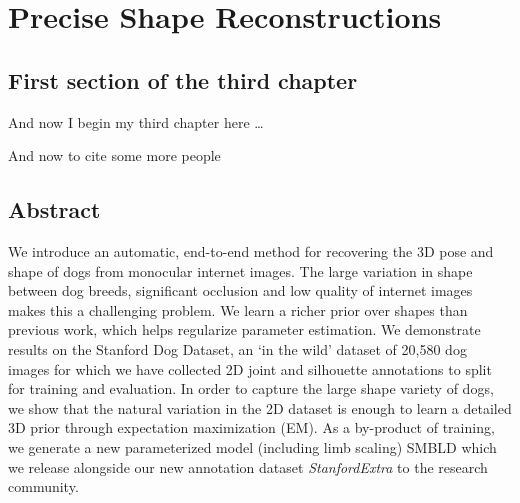 \chapter{Precise Shape Reconstructions}

\ifpdf
    \graphicspath{{Chapter4/Figs/Raster/}{Chapter4/Figs/PDF/}{Chapter4/Figs/}}
\else
    \graphicspath{{Chapter4/Figs/Vector/}{Chapter4/Figs/}}
\fi

\section{First section of the third chapter}
And now I begin my third chapter here \dots

And now to cite some more people~\citet{Rea85,Ancey1996}


\section{Abstract}
  We introduce an automatic, end-to-end method for recovering the 3D pose and shape of dogs from monocular internet images. 
  The large variation in shape between dog breeds, significant occlusion and low quality of internet images makes this a challenging problem.
  We learn a richer prior over shapes than previous work, which helps regularize parameter estimation.
  We demonstrate results on the Stanford Dog Dataset, an `in the wild' dataset of 20,580 dog images for which we have collected 2D joint and silhouette annotations to split for training and evaluation. 
  In order to capture the large shape variety of dogs, we show that the natural variation in the 2D dataset is enough to learn a detailed 3D prior through expectation maximization (EM).
  As a by-product of training, we generate a new parameterized model (including limb scaling) SMBLD which we release alongside our new annotation dataset \emph{StanfordExtra} to the research community.
    
